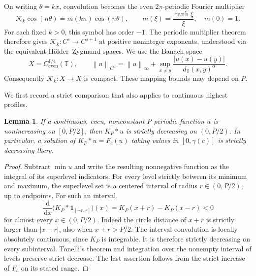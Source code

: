 \documentclass[11pt,a4paper]{article}
\newtheorem{lemma}[theorem]{Lemma}
\theoremstyle{remark}
\newcommand{\T}{\mathbb T}
\newcommand{\K}{\mathcal K}
\newcommand{\dd}{\,\mathrm d}
\newcommand{\norm}[1]{\left\lVert#1\right\rVert}
\begin{document}
On writing $\theta=kx$, convolution becomes the even $2\pi$-periodic
Fourier multiplier
\begin{equation}\label{eq:multiplier}
 \K_k\cos(n\theta)=m(kn)\cos(n\theta),\qquad
 m(\xi)=\frac{\tanh\xi}{\xi},\quad m(0)=1.
\end{equation}
For each fixed $k>0$, this symbol has order $-1$. The periodic multiplier
theorem \cite[Proposition 2.7]{EJC} therefore gives
$\K_k:C^s\to C^{s+1}$ at positive noninteger exponents, understood via
the equivalent H\"older--Zygmund spaces. We use the Banach space
\[
 X=C^{1/4}_{\mathrm{even}}(\T),\qquad
 \norm{u}_{C^\alpha}=\norm{u}_\infty+
 \sup_{x\ne y}\frac{|u(x)-u(y)|}{d_\T(x,y)^\alpha}.
\]
Consequently $\K_k:X\to X$ is compact. These mapping bounds may depend
on $P$.

We first record a strict comparison that also applies to continuous
highest profiles.
\begin{lemma}\label{lem:strict-comparison}
If a continuous, even, nonconstant $P$-periodic function $u$ is
nonincreasing on $[0,P/2]$, then $K_P*u$ is strictly decreasing on
$(0,P/2)$. In particular, a solution of $K_P*u=F_c(u)$ taking values in
$[0,\gamma(c)]$ is strictly decreasing there.
\end{lemma}
\begin{proof}
Subtract $\min u$ and write the resulting nonnegative function as the
integral of its superlevel indicators. For every level strictly between
its minimum and maximum, the superlevel set is a centered interval of
radius $r\in(0,P/2)$, up to endpoints. For such an interval,
\[
 \frac{\dd}{\dd x}\bigl(K_P*\mathbf1_{[-r,r]}\bigr)(x)
       =K_P(x+r)-K_P(x-r)<0
\]
for almost every $x\in(0,P/2)$. Indeed the circle distance of $x+r$ is
strictly larger than $|x-r|$, also when $x+r>P/2$.
The interval convolution is locally absolutely continuous, since $K_P$ is
integrable. It is therefore strictly decreasing on every subinterval.
Tonelli's theorem and integration over the nonempty interval of levels
preserve strict decrease. The last assertion follows from the strict
increase of $F_c$ on its stated range.
\end{proof}
\end{document}
